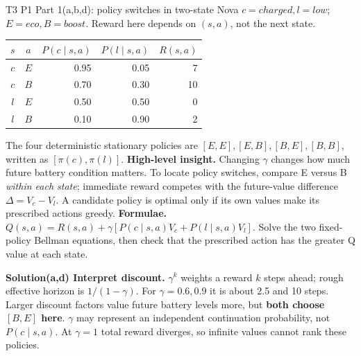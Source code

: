 \documentclass[10pt,a4paper]{article}
\newcommand{\ans}{\par\smallskip\textbf{\color{good}Solution\quad}}
\begin{document}
\begin{question}{T3 P1 Part 1(a,b,d): policy switches in two-state Nova}\label{q:t3p1discount}
$c=charged,l=low$; $E=eco,B=boost$. Reward here depends on $(s,a)$, not the next state.
\begin{center}
\begin{tabular}{@{}ccrrr@{}}
\toprule $s$ & $a$ & $P(c\mid s,a)$ & $P(l\mid s,a)$ & $R(s,a)$ \\\midrule
$c$ & $E$ & 0.95 & 0.05 & 7 \\
$c$ & $B$ & 0.70 & 0.30 & 10 \\
$l$ & $E$ & 0.50 & 0.50 & 0 \\
$l$ & $B$ & 0.10 & 0.90 & 2 \\\bottomrule
\end{tabular}
\end{center}
The four deterministic stationary policies are $[E,E],[E,B],[B,E],[B,B]$, written as $[\pi(c),\pi(l)]$.
\textbf{High-level insight.} Changing $\gamma$ changes how much future battery condition matters. To locate policy switches, compare E versus B \emph{within each state}; immediate reward competes with the future-value difference $\Delta=V_c-V_l$. A candidate policy is optimal only if its own values make its prescribed actions greedy.
\textbf{Formulae.} $Q(s,a)=R(s,a)+\gamma[P(c\mid s,a)V_c+P(l\mid s,a)V_l]$. Solve the two fixed-policy Bellman equations, then check that the prescribed action has the greater Q value at each state.
\ans \textbf{(a,d) Interpret discount.} $\gamma^k$ weights a reward $k$ steps ahead; rough effective horizon is $1/(1-\gamma)$. For $\gamma=0.6,0.9$ it is about 2.5 and 10 steps. Larger discount factors value future battery levels more, but \textbf{both choose $[B,E]$ here}. $\gamma$ may represent an independent continuation probability, not $P(c\mid s,a)$. At $\gamma=1$ total reward diverges, so infinite values cannot rank these policies.


\end{question}
\end{document}
